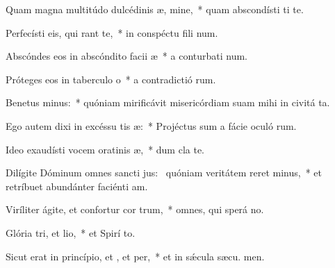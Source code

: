 \item Quam magna multitúdo dulcédinis æ, mine,~* quam abscondísti ti te.
\item Perfecísti eis, qui rant  te,~* in conspéctu fili num.
\item Abscóndes eos in abscóndito facii æ~* a conturbati num.
\item Próteges eos in taberculo o~* a contradictió rum.
\item Benetus minus:~* quóniam mirificávit misericórdiam suam mihi in civitá ta.
\item Ego autem dixi in excéssu tis æ:~* Projéctus sum a fácie oculó rum.
\item Ideo exaudísti vocem oratinis æ,~* dum cla  te.
\item Dilígite Dóminum omnes sancti jus:~\pscross{} quóniam veritátem reret minus,~* et retríbuet abundánter faciénti am.
\item Viríliter ágite, et confortur cor trum,~* omnes, qui sperá  no.
\item Glória tri, et lio,~* et Spirí to.
\item Sicut erat in princípio, et , et per,~* et in sǽcula sæcu. men.
